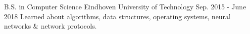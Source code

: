 
\begin{cventries}

  \cventry
    {B.S. in Computer Science} %
    {Eindhoven University of Technology} %
    {} %
    {Sep. 2015 - June 2018} %
    {
      {Learned about algorithms, data structures, operating systems, neural networks \& network protocols.}
    }

\end{cventries}
